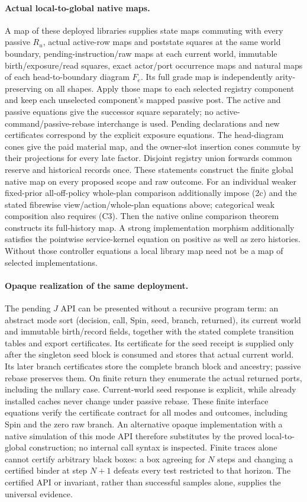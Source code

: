 \documentclass{article}
\begin{document}
\paragraph{Actual local-to-global native maps.}
A map of these deployed libraries supplies state maps commuting with every passive $R_u$, actual active-row maps and poststate squares at the same world boundary, pending-instruction/raw maps at each current world, immutable birth/exposure/read squares, exact actor/port occurrence maps and natural maps of each head-to-boundary diagram $F_e$. Its full grade map is independently arity-preserving on all shapes. Apply those maps to each selected registry component and keep each unselected component's mapped passive post. The active and passive equations give the successor square separately; no active-command/passive-rebase interchange is used. Pending declarations and new certificates correspond by the explicit exposure equations. The head-diagram cones give the paid material map, and the owner-slot insertion cones commute by their projections for every late factor. Disjoint registry union forwards common reserve and historical records once. These statements construct the finite global native map on every proposed scope and raw outcome. For an individual weaker fixed-prior all-off-policy whole-plan comparison additionally impose (2c) and the stated fibrewise view/action/whole-plan equations above; categorical weak composition also requires (C3). Then the native online comparison theorem constructs its full-history map. A strong implementation morphism additionally satisfies the pointwise service-kernel equation on positive as well as zero histories. Without those controller equations a local library map need not be a map of selected implementations.

\paragraph{Opaque realization of the same deployment.}
The pending $J$ API can be presented without a recursive program term: an abstract mode sort (decision, call, Spin, seed, branch, returned), its current world and immutable birth/record fields, together with the stated complete transition tables and export certificates. Its certificate for the seed receipt is supplied only after the singleton seed block is consumed and stores that actual current world. Its later branch certificates store the complete branch block and ancestry; passive rebase preserves them. On finite return they enumerate the actual returned ports, including the nullary case. Current-world seed response is explicit, while already installed caches never change under passive rebase. These finite interface equations verify the certificate contract for all modes and outcomes, including Spin and the zero raw branch. An alternative opaque implementation with a native simulation of this mode API therefore substitutes by the proved local-to-global construction; no internal call syntax is inspected. Finite traces alone cannot certify arbitrary black boxes: a box agreeing for $N$ steps and changing a certified binder at step $N+1$ defeats every test restricted to that horizon. The certified API or invariant, rather than successful samples alone, supplies the universal evidence.
\end{document}
